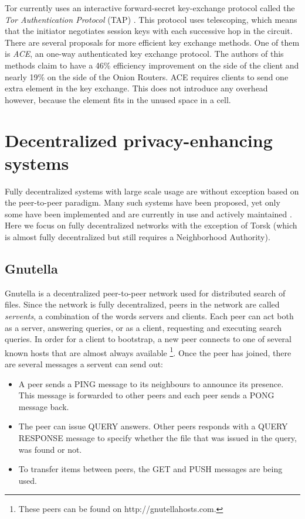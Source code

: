 \documentclass{article}
\begin{document}
		Tor currently uses an interactive forward-secret key-exchange protocol called the \emph{Tor Authentication Protocol} (TAP) \cite{backes2012ace}. This protocol uses telescoping, which means that the initiator negotiates session keys with each successive hop in the circuit. There are several proposals for more efficient key exchange methods. One of them is \emph{ACE}, an one-way authenticated key exchange protocol. The authors of this methods claim to have a 46\% efficiency improvement on the side of the client and nearly 19\% on the side of the Onion Routers. ACE requires clients to send one extra element in the key exchange. This does not introduce any overhead however, because the element fits in the unused space in a cell.

\section{Decentralized privacy-enhancing systems}
	\label{sec:decentralized}
	Fully decentralized systems with large scale usage are without exception based on the peer-to-peer paradigm. Many such systems have been proposed, yet only some have been implemented and are currently in use and actively maintained \cite{mislove2004ap3, rennhard2002introducing, panchenko2006nisan, rowstron2001pastry, nambiar2006salsa, freedman2002tarzan, ripeanu2001peer, androutsellis2004survey}. Here we focus on fully decentralized networks with the exception of Torsk (which is almost fully decentralized but still requires a Neighborhood Authority).

	\subsection{Gnutella} %
		Gnutella is a decentralized peer-to-peer network used for distributed search of files. Since the network is fully decentralized, peers in the network are called \emph{servents}, a combination of the words servers and clients. Each peer can act both as a server, answering queries, or as a client, requesting and executing search queries. In order for a client to bootstrap, a new peer connects to one of several known hosts that are almost always available \footnote{These peers can be found on http://gnutellahosts.com.}. Once the peer has joined, there are several messages a servent can send out:
	
		\begin{itemize}
			\item A peer sends a PING message to its neighbours to announce its presence. This message is forwarded to other peers and each peer sends a PONG message back.
			\item The peer can issue QUERY answers. Other peers responds with a QUERY RESPONSE message to specify whether the file that was issued in the query, was found or not.
			\item To transfer items between peers, the GET and PUSH messages are being used.
		\end{itemize}
		
\end{document}

